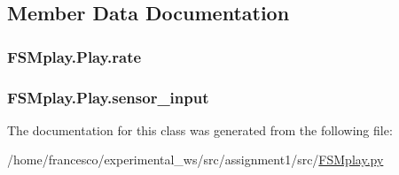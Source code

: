 \subsection{Member Data Documentation}
\subsubsection[{\texorpdfstring{rate}{rate}}]{\setlength{\rightskip}{0pt plus 5cm}F\+S\+Mplay.\+Play.\+rate}\hypertarget{classFSMplay_1_1Play_ad0f5331aa8db5087e451db135bd9e1d8}{}\label{classFSMplay_1_1Play_ad0f5331aa8db5087e451db135bd9e1d8}
\subsubsection[{\texorpdfstring{sensor\+\_\+input}{sensor_input}}]{\setlength{\rightskip}{0pt plus 5cm}F\+S\+Mplay.\+Play.\+sensor\+\_\+input}\hypertarget{classFSMplay_1_1Play_a01e386e2402ae9ae8a3dcf475d8ce180}{}\label{classFSMplay_1_1Play_a01e386e2402ae9ae8a3dcf475d8ce180}


The documentation for this class was generated from the following file\+:\begin{DoxyCompactItemize}
\item 
/home/francesco/experimental\+\_\+ws/src/assignment1/src/\hyperlink{FSMplay_8py}{F\+S\+Mplay.\+py}\end{DoxyCompactItemize}

